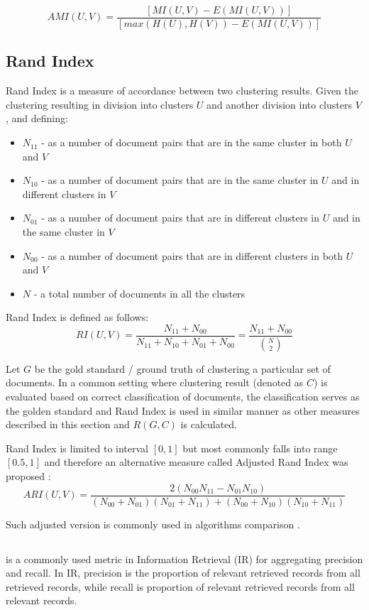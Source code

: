 \documentclass[a4paper, 12pt, oneside]{Thesis} %
\begin{document}
$$ AMI(U, V) = \frac{[MI(U, V) - E(MI(U, V))]}{[max(H(U), H(V)) - E(MI(U, V))]} $$

\subsection{Rand Index}\label{section:RandIndex} Rand Index \cite{rand1971objective} is a measure of accordance between two clustering results. Given the clustering resulting in division into clusters $U$ and another division into clusters $V$, and defining:
\begin{itemize}
 \item $N_{11}$ - as a number of document pairs that are in the same cluster in both $U$ and $V$
 \item $N_{10}$ - as a number of document pairs that are in the same cluster in $U$ and in different clusters in $V$
 \item $N_{01}$ - as a number of document pairs that are in different clusters in $U$ and in the same cluster in $V$
 \item $N_{00}$ - as a number of document pairs that are in different clusters in both $U$ and $V$ 
 \item $N$ - a total number of documents in all the clusters

\end{itemize} 

Rand Index is defined as follows:
$$ RI(U, V) = \frac{N_{11} + N_{00}}{N_{11} + N_{10} + N_{01} + N_{00}} = \frac{N_{11} + N_{00}}{\binom{N}{2}} $$

Let $G$ be the gold standard / ground truth of clustering a particular set of documents. In a common setting where clustering result (denoted as $C$) is evaluated based on correct classification of documents, the classification serves as the golden standard and Rand Index is used in similar manner as other measures described in this section and $R(G, C)$ is calculated.

Rand Index is limited to interval $[0, 1]$ but most commonly falls into range $[0.5, 1]$ and therefore an alternative measure called Adjusted Rand Index was proposed \cite{hubert1985comparing}:
$$ ARI(U, V) = \frac{2(N_{00} N_{11} - N_{01}N_{10})}{(N_{00} + N_{01})(N_{01} + N_{11}) + (N_{00} + N_{10})(N_{10} + N_{11})} $$

Such adjusted version is commonly used in algorithms comparison \cite{vinh2010information}.

\subsection{}\label{section:FMeasure}  is a commonly used metric in Information Retrieval (IR) for aggregating precision and recall. In IR, precision is the proportion of relevant retrieved records from all retrieved records, while recall is proportion of relevant retrieved records from all relevant records.
\end{document}
